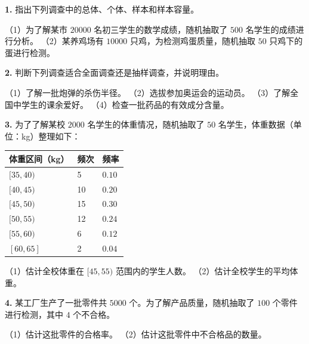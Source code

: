 \begin{practice}


\textbf{1.} 指出下列调查中的总体、个体、样本和样本容量。

（1）为了解某市 $20000$ 名初三学生的数学成绩，随机抽取了 $500$ 名学生的成绩进行分析。
（2）某养鸡场有 $10000$ 只鸡，为检测鸡蛋质量，随机抽取 $50$ 只鸡下的蛋进行检测。

\textbf{2.} 判断下列调查适合全面调查还是抽样调查，并说明理由。

（1）了解一批炮弹的杀伤半径。
（2）选拔参加奥运会的运动员。
（3）了解全国中学生的课余爱好。
（4）检查一批药品的有效成分含量。

\textbf{3.} 为了了解某校 $2000$ 名学生的体重情况，随机抽取了 $50$ 名学生，体重数据（单位：kg）整理如下：

\begin{center}
\begin{tabular}{lll}
\toprule
体重区间（kg） & 频次 & 频率 \\
\midrule
$[35, 40)$ & 5 & $0.10$ \\
$[40, 45)$ & 10 & $0.20$ \\
$[45, 50)$ & 15 & $0.30$ \\
$[50, 55)$ & 12 & $0.24$ \\
$[55, 60)$ & 6 & $0.12$ \\
$[60, 65]$ & 2 & $0.04$ \\
\bottomrule
\end{tabular}
\end{center}


（1）估计全校体重在 $[45, 55)$ 范围内的学生人数。
（2）估计全校学生的平均体重。

\textbf{4.} 某工厂生产了一批零件共 $5000$ 个。为了解产品质量，随机抽取了 $100$ 个零件进行检测，其中 $4$ 个不合格。

（1）估计这批零件的合格率。
（2）估计这批零件中不合格品的数量。

\end{practice}



